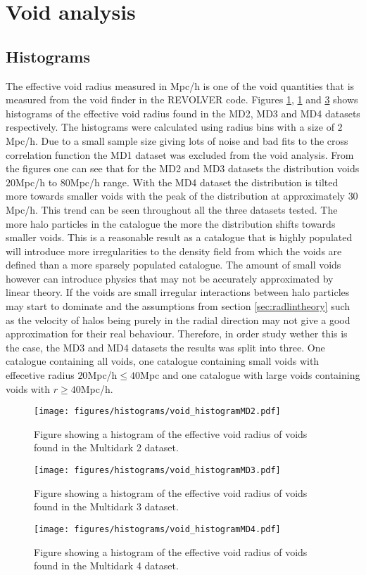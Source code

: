 \section{Void analysis}
\subsection{Histograms}
The effective void radius measured in Mpc/h is one of the void quantities that is measured from the void finder in the REVOLVER code. Figures \ref{fig:voidhistMD2}, \ref{fig:voidhistMD2} and \ref{fig:voidhistMD4} shows histograms of the effective void radius found in the MD2, MD3 and MD4 datasets respectively. The histograms were calculated using radius bins with a size of $2$Mpc/h. Due to a small sample size giving lots of noise and bad fits to the cross correlation function the MD1 dataset was excluded from the void analysis. From the figures one can see that for the MD2 and MD3 datasets the distribution voids $20$Mpc/h to $80$Mpc/h range. With the MD4 dataset the distribution is tilted more towards smaller voids with the peak of the distribution at approximately $30$Mpc/h. This trend can be seen throughout all the three datasets tested. The more halo particles in the catalogue the more the distribution shifts towards smaller voids. This is a reasonable result as a catalogue that is highly populated will introduce more irregularities to the density field from which the voids are defined than a more sparsely populated catalogue. The amount of small voids however can introduce physics that may not be accurately approximated by linear theory. If the voids are small irregular interactions between halo particles may start to dominate and the assumptions from section \ref{sec:radlintheory} such as the velocity of halos being purely in the radial direction may not give a good approximation for their real behaviour. Therefore, in order study wether this is the case, the MD3 and MD4 datasets the results was split into three. One catalogue containing all voids, one catalogue containing small voids with effecetive radius $20$Mpc/h$\leq 40$Mpc and one catalogue with large voids containing voids with $r\geq 40$Mpc/h. 

\begin{figure}[htbp]\label{fig:voidhistMD2}
    \texttt{[image: figures/histograms/void\_histogramMD2.pdf]}
    \caption{Figure showing a histogram of the effective void radius of voids found in the Multidark 2 dataset.}
\end{figure}
\begin{figure}[htbp]\label{fig:voidhistMD3}
    \texttt{[image: figures/histograms/void\_histogramMD3.pdf]}
    \caption{Figure showing a histogram of the effective void radius of voids found in the Multidark 3 dataset.}
\end{figure}
\begin{figure}[htbp]\label{fig:voidhistMD4}
    \texttt{[image: figures/histograms/void\_histogramMD4.pdf]}
    \caption{Figure showing a histogram of the effective void radius of voids found in the Multidark 4 dataset.}
\end{figure}
